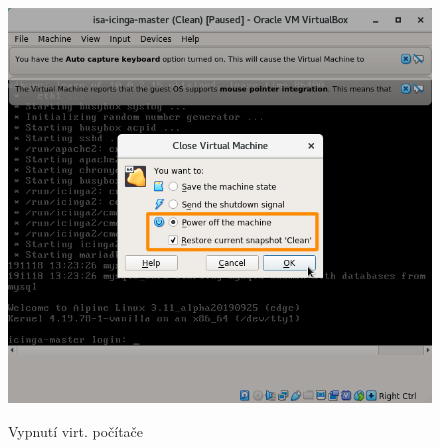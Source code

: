 \begin{figure}[!ht]
	\caption{Vypnutí virt. počítače}
	\centering
	\includegraphics[width=0.67\linewidth]{files/vbox-shutdown.png}
	\label{fig:shutdown}
\end{figure}
